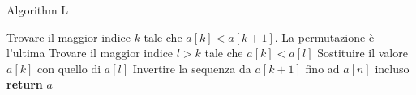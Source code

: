 \begin{algorithm}
	\caption{Algorithm L}
	\label{alg:l}
	\begin{algorithmic}[1]
		\State Trovare il maggior indice $k$ tale che $a[k] < a[k + 1]$.
			\State La permutazione è l'ultima
		\EndIf
		\State Trovare il maggior indice $l > k$ tale che $a[k] < a[l]$
		\State Sostituire il valore $a[k]$ con quello di $a[l]$
		\State Invertire la sequenza da $a[k + 1]$ fino ad $a[n]$ incluso
		\State \textbf{return} $a$
		\EndProcedure
	\end{algorithmic}
\end{algorithm}